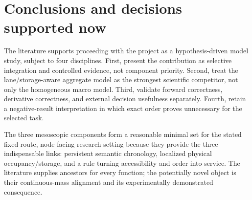 \documentclass[11pt,a4paper]{article}
\begin{document}
\section{Conclusions and decisions supported now}

The literature supports proceeding with the project as a hypothesis-driven model study, subject to four disciplines. First, present the contribution as selective integration and controlled evidence, not component priority. Second, treat the lane/storage-aware aggregate model as the strongest scientific competitor, not only the homogeneous macro model. Third, validate forward correctness, derivative correctness, and external decision usefulness separately. Fourth, retain a negative-result interpretation in which exact order proves unnecessary for the selected task.

The three mesoscopic components form a reasonable minimal set for the stated fixed-route, node-facing research setting because they provide the three indispensable links: persistent semantic chronology, localized physical occupancy/storage, and a rule turning accessibility and order into service. The literature supplies ancestors for every function; the potentially novel object is their continuous-mass alignment and its experimentally demonstrated consequence.
\end{document}
